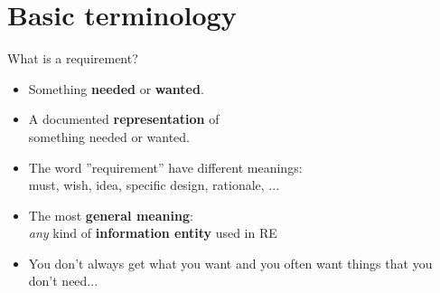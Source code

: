 
\section{Basic terminology}

\begin{Slide}{What is a requirement?}

\begin{itemize}
\item Something \textbf{needed} or \textbf{wanted}.

\item A documented \textbf{representation} of\\something needed or wanted.
\item The word ''requirement'' have different meanings:\\
  must, wish, idea, specific design, rationale, ...

\item The most \textbf{general meaning}:\\
  \textit{any} kind of \textbf{information entity} used in RE

\item You don't always get what you want and you often want things that you don't need...

\end{itemize}
\end{Slide}